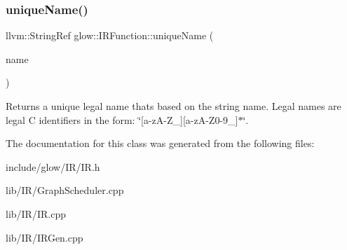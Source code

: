 \subsubsection{\texorpdfstring{unique\+Name()}{uniqueName()}}
{\footnotesize\ttfamily llvm\+::\+String\+Ref glow\+::\+I\+R\+Function\+::unique\+Name (\begin{DoxyParamCaption}\item[{llvm\+::\+String\+Ref}]{name }\end{DoxyParamCaption})\hspace{0.3cm}{\ttfamily [inline]}}

\begin{DoxyReturn}{Returns}
a unique legal name that\textquotesingle{}s based on the string {\ttfamily name}. Legal names are legal C identifiers in the form\+: \char`\"{}\mbox{[}a-\/z\+A-\/\+Z\+\_\+\mbox{]}\mbox{[}a-\/z\+A-\/\+Z0-\/9\+\_\+\mbox{]}$\ast$\char`\"{}. 
\end{DoxyReturn}


The documentation for this class was generated from the following files\+:\begin{DoxyCompactItemize}
\item 
include/glow/\+I\+R/I\+R.\+h\item 
lib/\+I\+R/Graph\+Scheduler.\+cpp\item 
lib/\+I\+R/I\+R.\+cpp\item 
lib/\+I\+R/I\+R\+Gen.\+cpp\end{DoxyCompactItemize}
